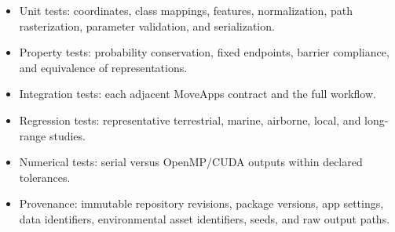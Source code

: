 \begin{itemize}
  \item Unit tests: coordinates, class mappings, features, normalization, path rasterization, parameter validation, and serialization.
  \item Property tests: probability conservation, fixed endpoints, barrier compliance, and equivalence of representations.
  \item Integration tests: each adjacent MoveApps contract and the full workflow.
  \item Regression tests: representative terrestrial, marine, airborne, local, and long-range studies.
  \item Numerical tests: serial versus OpenMP/CUDA outputs within declared tolerances.
  \item Provenance: immutable repository revisions, package versions, app settings, data identifiers, environmental asset identifiers, seeds, and raw output paths.
\end{itemize}
